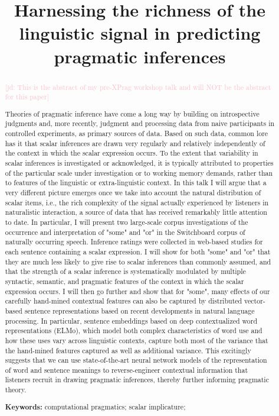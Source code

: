 \documentclass[11pt,a4paper]{article}
\title{Harnessing the richness of the linguistic signal in predicting pragmatic inferences }
\newcommand{\jd}[1]{\textcolor{Pink}{[jd: #1]}}
\begin{document}
\maketitle


\begin{abstract}
  
\jd{This is the abstract of my pre-XPrag workshop talk and will NOT be the abstract for this paper}

Theories of pragmatic inference have come a long way by building on introspective judgments and, more recently, judgment and processing data from naive participants in controlled experiments, as primary sources of data. Based on such data, common lore has it that scalar inferences are drawn very regularly and relatively independently of the context in which the scalar expression occurs. To the extent that variability in scalar inferences is investigated or acknowledged, it is typically attributed to properties of the particular scale under investigation or to working memory demands, rather than to features of the linguistic or extra-linguistic context.
In this talk I will argue that a very different picture emerges once we take into account the natural distribution of scalar items, i.e., the rich complexity of the signal actually experienced by listeners in naturalistic interaction, a source of data that has received remarkably little attention to date. In particular, I will present two large-scale corpus investigations of the occurrence and interpretation of "some" and "or" in the Switchboard corpus of naturally occurring speech. Inference ratings were collected in web-based studies for each sentence containing a scalar expression. I will show for both "some" and "or" that they are much less likely to give rise to scalar inferences than commonly assumed, and that the strength of a scalar inference is systematically modulated by multiple syntactic, semantic, and pragmatic features of the context in which the scalar expression occurs.
I will then go further and show that for "some", many effects of our carefully hand-mined contextual features can also be captured by distributed vector-based sentence representations based on recent developments in natural language processing. In particular, sentence embeddings based on deep contextualized word representations (ELMo), which model both complex characteristics of word use and how these uses vary across linguistic contexts, capture both most of the variance that the hand-mined features captured as well as additional variance. This excitingly suggests that we can use state-of-the-art neural network models of the representation of word and sentence meanings to reverse-engineer contextual information that listeners recruit in drawing pragmatic inferences, thereby further informing pragmatic theory.

\textbf{Keywords:} 
computational pragmatics; scalar implicature;
\end{abstract}
\end{document}
